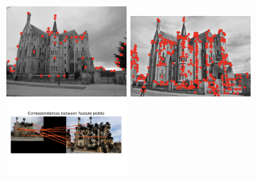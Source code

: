 \begin{figure}[h]
    \centering
    \includegraphics[width=4cm]{e_gaudi1.png}
    \includegraphics[width=4cm]{e_gaudi2.png}
    \includegraphics[width=4cm]{e_gaudi3.png}
    \label{fig:result1}
\end{figure}

